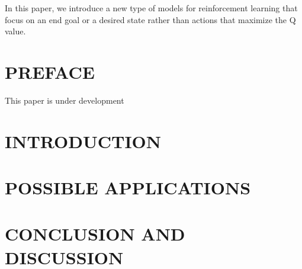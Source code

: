 \documentclass[12pt]{article}
\theoremstyle{definition}
\theoremstyle{remark}
\theoremstyle{definition}
\begin{document}
In this paper, we introduce a new type of models for reinforcement learning that focus on an end goal or a desired state rather than actions that maximize the Q value.


\newpage
\vspace*{1cm}
\section*{PREFACE} \vspace*{0.5cm}
This paper is under development



\newpage
\vspace*{1cm}
\section*{INTRODUCTION} \vspace*{0.5cm}



\newpage
\vspace*{1cm}
\section*{POSSIBLE APPLICATIONS} \vspace*{0.5cm}



\newpage
\vspace*{1cm}
\section*{CONCLUSION AND DISCUSSION} \vspace*{0.5cm}
\end{document}
